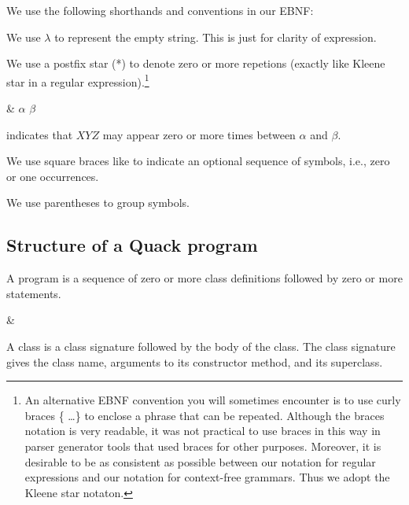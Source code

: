 \documentclass[11pt]{article}
\begin{document}
We use the following shorthands and conventions in our EBNF: 

\begin{bullets}

\item We use $\lambda$ to represent the empty string.  
This is just for clarity of expression. 

\item  We use a postfix star (*) to denote zero or more repetions (exactly like
  Kleene star in a regular expression).\footnote{An alternative EBNF
    convention you will sometimes encounter is to use curly braces \{
    \ldots \} to enclose a phrase that can be repeated.   Although the
    braces notation is very readable, it was not practical to use
    braces in this way in parser generator tools that used braces for
    other purposes.  Moreover, it is desirable to be as consistent as
    possible between our notation for regular expressions and our
    notation for context-free grammars. Thus we adopt the Kleene star
    notaton.}  

\begin{grammar}
 & \(\alpha\)    \(\beta\)
\end{grammar}

indicates that $X Y Z$ may appear zero or more times between $\alpha$
and $\beta$. 

\item We use square braces like   to indicate an optional sequence of
  symbols, i.e., zero or one occurrences. 

\item We use parentheses to group symbols. 

\end{bullets}

\subsection{Structure of a Quack program}

A program is a sequence of zero or more class definitions followed by zero or
more statements. 

\begin{grammar}
 &
\end{grammar}

A class is a class signature followed by the body of the class.  The
class signature gives the class name, arguments to its constructor
method,  and its superclass.  
\end{document}
